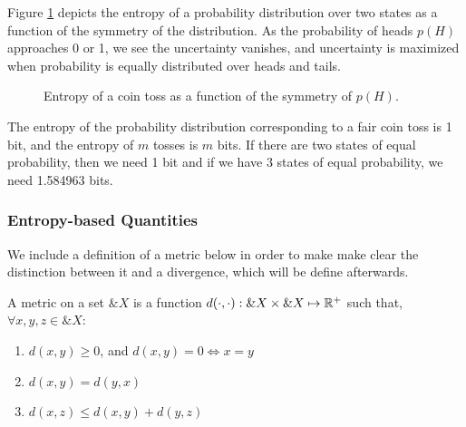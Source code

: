 Figure \ref{fig:entropy-coin-toss} depicts the entropy of a
probability distribution over two states as a function of the symmetry
of the distribution.  As the probability of heads $p(H)$ approaches 0
or 1, we see the uncertainty vanishes, and uncertainty is maximized
when probability is equally distributed over heads and tails.

\begin{figure}[H]
  \centering
  \caption{Entropy of a coin toss as a function of the symmetry of $p(H)$.}
  \label{fig:entropy-coin-toss}
\end{figure}

\begin{example}
  The entropy of the probability distribution corresponding to a fair coin toss
  is 1 bit, and the entropy of $m$ tosses is $m$ bits. If there are two states
  of equal probability, then we need 1 bit and if we have 3 states of equal
  probability, we need 1.584963 bits.
\end{example}

\subsubsection*{Entropy-based Quantities}

We include a definition of a metric below in order to make make clear
the distinction between it and a divergence, which will be define
afterwards.

\begin{definition}
  A \textnormal{\sffamily metric} on a set $\&X$ is a function $d(\cdot, \cdot): \&X \times
  \&X \mapsto \mathbb{R}^+$ such that, $\forall x, y, z \in \&X$:
  \begin{enumerate}
  \item $d(x, y) \geq 0$, and $d(x, y) = 0 \iff x = y$
  \item $d(x, y) = d(y, x)$
  \item $d(x, z) \leq d(x, y) + d(y, z)$
  \end{enumerate}
\end{definition}

